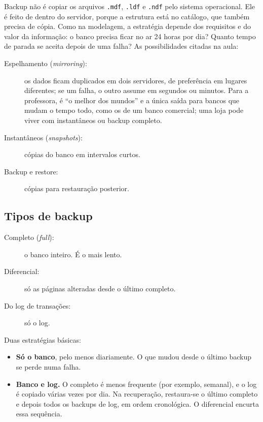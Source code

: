 Backup não é copiar os arquivos \texttt{.mdf}, \texttt{.ldf} e
\texttt{.ndf} pelo sistema operacional. Ele é feito de dentro do
servidor, porque a estrutura está no catálogo, que também precisa de
cópia. Como na modelagem, a estratégia depende dos requisitos e do valor
da informação: o banco precisa ficar no ar
24 horas por dia? Quanto tempo de parada se aceita depois de uma falha?
As possibilidades citadas na aula:

\begin{description}
	\item[Espelhamento (\emph{mirroring}):] os dados ficam duplicados em
	dois servidores, de preferência em lugares diferentes; se um falha, o
	outro assume em segundos ou minutos. Para a professora, é ``o melhor
	dos mundos'' e a única saída para bancos que mudam o tempo todo, como
	os de um banco comercial; uma loja pode viver com instantâneos ou
	backup completo.
	\item[Instantâneos (\emph{snapshots}):] cópias do banco em intervalos
	curtos.
	\item[Backup e restore:] cópias para restauração posterior.
\end{description}

\subsection{Tipos de backup}

\begin{description}
	\item[Completo (\emph{full}):] o banco inteiro. É o mais lento.
	\item[Diferencial:] só as páginas alteradas desde o último completo.
	\item[Do log de transações:] só o log.
\end{description}

Duas estratégias básicas:

\begin{itemize}
	\item \textbf{Só o banco}, pelo menos diariamente. O que mudou desde o
	último backup se perde numa falha.
	\item \textbf{Banco e log.} O completo é menos frequente (por exemplo,
	semanal), e o log é copiado várias vezes por dia. Na recuperação,
	restaura-se o último completo e depois todos os backups de log, em
	ordem cronológica. O diferencial encurta essa sequência.
\end{itemize}

